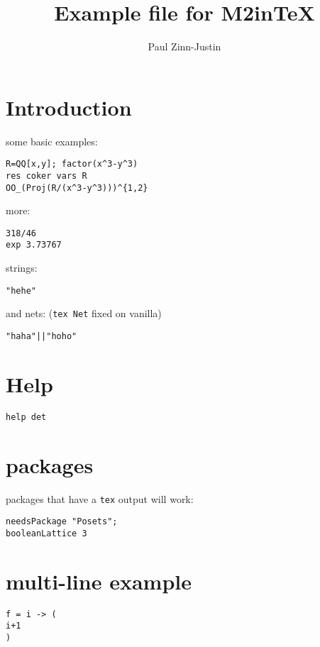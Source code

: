 \documentclass[12pt,a4paper]{amsart}
\title{Example file for M2inTeX}
\author{Paul Zinn-Justin}
\begin{document}
\maketitle

\section{Introduction}
some basic examples:
\begin{verbatim}
R=QQ[x,y]; factor(x^3-y^3)
res coker vars R
OO_(Proj(R/(x^3-y^3)))^{1,2}
\end{verbatim}
more:
\begin{verbatim}
318/46
exp 3.73767
\end{verbatim}
strings:
\begin{verbatim}
"hehe"
\end{verbatim}
and nets: ({\tt tex Net} fixed on vanilla)
\begin{verbatim}
"haha"||"hoho"
\end{verbatim}

\section{Help}
\begin{verbatim}
help det
\end{verbatim}

\section{packages}
packages that have a {\tt tex} output will work:
\begin{verbatim}
needsPackage "Posets";
booleanLattice 3
\end{verbatim}

\section{multi-line example}
\begin{verbatim}
f = i -> (
i+1
)
\end{verbatim}
\end{document}
